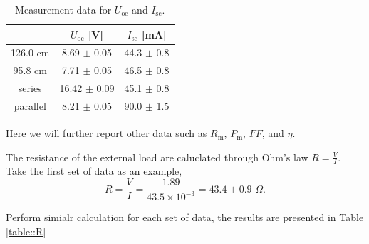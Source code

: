 \documentclass[a4paper]{article}
\begin{document}
\begin{table}[H]
	\centering
	\begin{tabular}{ccc}
		\hline
		         & $U_\text{oc}$ [V] & $I_\text{sc}$ [mA] \\
		\hline
		126.0 cm & 8.69  $\pm$ 0.05  & 44.3 $\pm$ 0.8     \\
		95.8 cm  & 7.71  $\pm$ 0.05  & 46.5 $\pm$ 0.8     \\
		series   & 16.42 $\pm$ 0.09  & 45.1 $\pm$ 0.8     \\
		parallel & 8.21  $\pm$ 0.05  & 90.0 $\pm$ 1.5     \\
		\hline
	\end{tabular}
	\caption{Measurement data for $U_\text{oc}$ and $I_\text{sc}$.}
	\label{table:ocsc}
\end{table}

Here we will further report other data such as $R_\text{m}$, $P_\text{m}$, $FF$, and $\eta$.

The resistance of the external load are caluclated through Ohm's law $\displaystyle R = \frac{V}{I}$. Take the first set of data as an example,
$$R = \frac{V}{I} = \frac{1.89}{43.5\times 10^{-3}} = 43.4 \pm 0.9\,\,\Omega.$$

Perform simialr calculation for each set of data, the results are presented in Table \ref{table::R}
\end{document}
